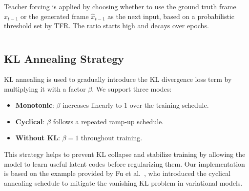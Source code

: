 Teacher forcing is applied by choosing whether to use the ground truth frame $x_{t-1}$ or the generated frame $\hat{x}_{t-1}$ as the next input, based on a probabilistic threshold set by TFR. The ratio starts high and decays over epochs.

\inputminted[firstline=418, lastline=430]{python}{../Trainer.py}

\subsection{KL Annealing Strategy}

KL annealing is used to gradually introduce the KL divergence loss term by multiplying it with a factor $\beta$. We support three modes:
\begin{itemize}
    \item \textbf{Monotonic}: $\beta$ increases linearly to 1 over the training schedule.
    \item \textbf{Cyclical}: $\beta$ follows a repeated ramp-up schedule.
    \item \textbf{Without KL}: $\beta = 1$ throughout training.
\end{itemize}

This strategy helps to prevent KL collapse and stabilize training by allowing the model to learn useful latent codes before regularizing them. Our implementation is based on the example provided by Fu et al.~\cite{fu_cyclical_2019_naacl}, who introduced the cyclical annealing schedule to mitigate the vanishing KL problem in variational models.

\inputminted[firstline=42, lastline=79]{python}{../Trainer.py}
